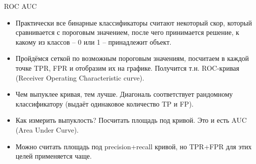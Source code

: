 \documentclass[9pt]{beamer}
\begin{document}

\begin{frame}{ROC AUC}
\begin{itemize}
    \item Практически все бинарные классификаторы считают некоторый скор, который сравнивается с пороговым значением, после чего принимается решение, к какому из классов -- 0 или 1 -- принадлежит объект.
    \item Пройдёмся сеткой по возможным пороговым значениям, посчитаем в каждой точке TPR, FPR и отобразим их на графике. Получится т.н. ROC-кривая (Receiver Operating Characteristic curve).
    \item Чем выпуклее кривая, тем лучше. Диагональ соответствует рандомному классификатору (выдаёт одинаковое количество TP и FP).
    \item Как измерить выпуклость? Посчитать площадь под кривой. Это и есть AUC (Area Under Curve).
    \item Можно считать площадь под precision+recall кривой, но TPR+FPR для этих целей применяется чаще.
\end{itemize}
\end{frame}
\end{document}
